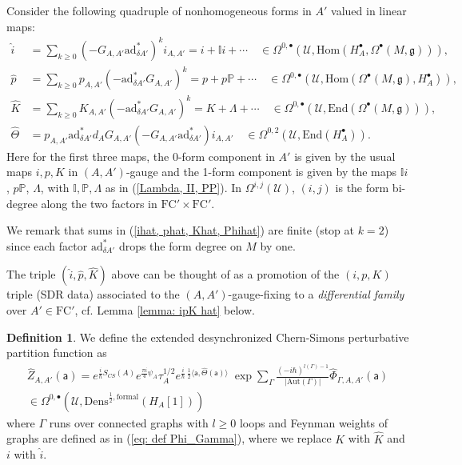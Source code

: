 \documentclass[11pt,a4paper]{amsart}
\theoremstyle{plain} %
\theoremstyle{definition}
\newtheorem{defn}[thm]{Definition}
\theoremstyle{remark}
\newcommand{\g}{\mathfrak{g}}
\newcommand{\mr}{\mathrm}
\newcommand{\sfa}{\mathsf{a}}
\newcommand{\bt}{\bullet}
\newcommand{\wh}{\widehat}
\newcommand{\mc}{\mathcal}
\newcommand{\ad}{\mathrm{ad}}
\newcommand{\FC}{\mathrm{FC}}
\begin{document}
{Consider the following quadruple of nonhomogeneous forms in $A'$ valued in linear maps:
\begin{equation}\label{ihat, phat, Khat, Phihat}
\begin{aligned}
    \wh{i}&=\sum_{k\geq 0} (-G_{A,A'}\ad^*_{\delta A'})^k i_{A,A'}=i+\mathbb{I}i+\cdots \quad \in \Omega^{0,\bt}(\mc{U},\mr{Hom}(H_A^\bt,\Omega^\bt(M,\g))), \\
    \wh{p}&= \sum_{k\geq 0} p_{A,A'}(-\ad^*_{\delta A'}G_{A,A'})^k=p+p\mathbb{P}+\cdots\quad \in \Omega^{0,\bt}(\mc{U},\mr{Hom}(\Omega^\bt(M,\g),H_A^\bt)), \\
     \wh{K}&= \sum_{k\geq 0} K_{A,A'}(-\ad^*_{\delta A'}G_{A,A'})^k=K+\Lambda+\cdots\quad \in \Omega^{0,\bt}(\mc{U},\mr{End}(\Omega^\bt(M,\g))),\\
     \wh\Theta&=p_{A,A'}\ad^*_{\delta A'} d_A G_{A,A'}(-G_{A,A'}\ad^*_{\delta A'}) i_{A,A'}\quad  \in \Omega^{0,2}(\mc{U},\mr{End}(H^\bt_A)).
\end{aligned}
\end{equation}
Here for the first three maps, the 0-form component in $A'$ is  given by the usual maps $i,p,K$ in $(A,A')$-gauge and the 1-form component is given by the maps $\mathbb{I}i$, $p\mathbb{P}$, $\Lambda$, with $\mathbb{I},\mathbb{P},\Lambda$ as in (\ref{Lambda, II, PP}). In $\Omega^{i,j}(\mc{U})$, $(i,j)$ is the form bi-degree along the two factors in $\FC'\times \FC'$.

We remark that sums in (\ref{ihat, phat, Khat, Phihat}) are finite (stop at $k=2$)
since each factor $\ad^*_{\delta A'}$ drops the form degree on $M$ by one. %

The triple $(\wh{i},\wh{p},\wh{K})$ above can be thought of as a promotion of the $(i,p,K)$ triple (SDR data) associated to the $(A,A')$-gauge-fixing to a \emph{differential family} over $A'\in\FC'$, cf. Lemma \ref{lemma: ipK hat} below.

\begin{defn}
We define the extended desynchronized Chern-Simons perturbative partition function as
\begin{multline}\label{Zhat}
    \wh{Z}_{A,A'}(\sfa) 
    =e^{\frac{i}{\hbar}S_{CS}(A)} 
    e^{\frac{\pi i}{4}\psi_A}\tau_{A}^{1/2}
e^{\frac{i}{\hbar}\,\frac12\langle \sfa, \wh\Theta(\sfa)\rangle}\;\exp \sum_\Gamma \frac{(-i\hbar)^{l(\Gamma)-1}}{|\mr{Aut}(\Gamma)|}\wh{\Phi}_{\Gamma,A,A'}(\sfa)\\
    \in \Omega^{0,\bt}(\mc{U},\mr{Dens}^{\frac12,\mr{formal}}(H_A[1]))
\end{multline}
where $\Gamma$ runs over connected graphs with 
$l\geq 0$ loops and Feynman weights of graphs are defined as in (\ref{eq: def Phi_Gamma}), where we replace $K$ with $\wh{K}$ and $i$ with $\wh{i}$.
\end{defn}

}
\end{document}
